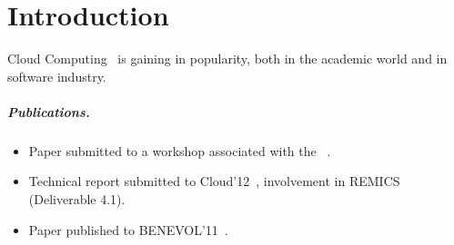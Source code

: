 \chapter{Introduction}

Cloud Computing~\cite{Armbrust:EECS-2009-28} is gaining in popularity,
both in the academic world and in software industry.

\paragraph{Publications.}

\begin{itemize}
  \item
    Paper submitted to a workshop associated with the ~\cite{ecmfa4clouda}.
  \item
    Technical report submitted to Cloud'12~\cite{remics_4_1}, 
    involvement in REMICS (Deliverable 4.1).
  \item
    Paper published to BENEVOL'11~\cite{mosser-brandtzæg-etal:2011}.
\end{itemize}
